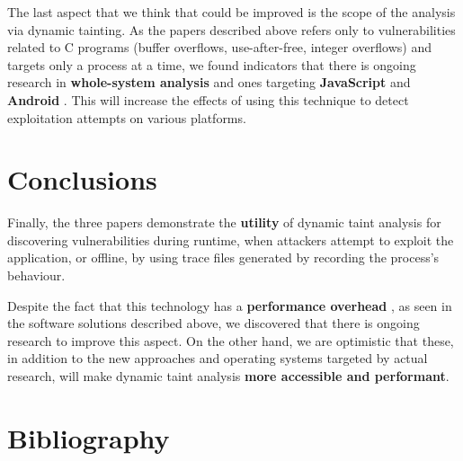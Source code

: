 \documentclass[10pt,a4paper,english,onecolumn]{IEEEtran}
\begin{document}
The last aspect that we think that could be improved is the scope of the analysis via dynamic tainting. As the papers described above refers only to vulnerabilities related to C programs (buffer overflows, use-after-free, integer overflows) and targets only a process at a time, we found indicators that there is ongoing research in \textbf{whole-system analysis} \cite{decaf++} and ones targeting \textbf{JavaScript} \cite{javascript_dta} and \textbf{Android} \cite{taintman}. This will increase the effects of using this technique to detect exploitation attempts on various platforms.

\section{Conclusions}

Finally, the three papers demonstrate the \textbf{utility} of dynamic taint analysis for discovering vulnerabilities during runtime, when attackers attempt to exploit the application, or offline, by using trace files generated by recording the process's behaviour.

Despite the fact that this technology has a \textbf{performance overhead} , as seen in the software solutions described above, we discovered that there is ongoing research to improve this aspect. On the other hand, we are optimistic that these, in addition to the new approaches and operating systems targeted by actual research, will make dynamic taint analysis \textbf{more accessible and performant}.

\section{Bibliography}
\nocite{*}
\printbibliography[heading=none]
\end{document}
